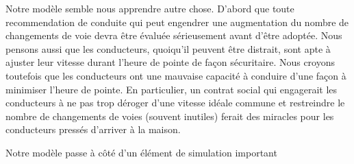 \documentclass[12pt,letterpaper]{article}
\begin{document}
Notre modèle semble nous apprendre autre chose. D'abord que toute recommendation de conduite
qui peut engendrer une augmentation du nombre de changements de voie devra être évaluée sérieusement
avant d'être adoptée. Nous pensons aussi que les conducteurs, quoiqu'il peuvent être distrait, sont
apte à ajuster leur vitesse durant l'heure de pointe de façon sécuritaire. Nous croyons toutefois
que les conducteurs ont une mauvaise capacité à conduire d'une façon à minimiser l'heure de pointe.
En particulier, un contrat social qui engagerait les conducteurs à ne pas trop déroger d'une vitesse
idéale commune et restreindre le nombre de changements de voies (souvent inutiles) ferait des
miracles pour les conducteurs pressés d'arriver à la maison.

Notre modèle passe à côté d'un élément de simulation important
\end{document}

